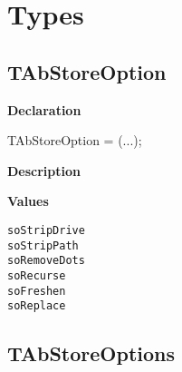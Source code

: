 \documentclass{report}
\newif\ifpdf
\begin{document}
\section{Types}
\ifpdf
\subsection*{\large{\textbf{TAbStoreOption}}\normalsize\hspace{1ex}\hrulefill}
\else
\subsection*{TAbStoreOption}
\fi
\label{AbArcTyp-TAbStoreOption}
\begin{list}{}{
\setlength{\itemindent}{0cm}
\setlength{\listparindent}{0cm}
\setlength{\leftmargin}{\evensidemargin}
\addtolength{\leftmargin}{\tmplength}
\settowidth{\labelsep}{X}
\addtolength{\leftmargin}{\labelsep}
\setlength{\labelwidth}{\tmplength}
}
\item[\textbf{Declaration}\hfill]
\ifpdf
\begin{flushleft}
\fi
\begin{ttfamily}
TAbStoreOption = (...);\end{ttfamily}

\ifpdf
\end{flushleft}
\fi

\par
\item[\textbf{Description}]
 \item[\textbf{Values}]
\begin{description}
\item[\texttt{soStripDrive}]  
\item[\texttt{soStripPath}]  
\item[\texttt{soRemoveDots}]  
\item[\texttt{soRecurse}]  
\item[\texttt{soFreshen}]  
\item[\texttt{soReplace}]  
\end{description}


\end{list}
\ifpdf
\subsection*{\large{\textbf{TAbStoreOptions}}\normalsize\hspace{1ex}\hrulefill}
\else
\end{document}

